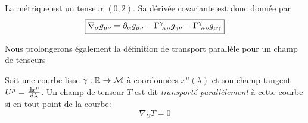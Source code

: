 \begin{exmp}
    La métrique est un tenseur $(0,2)$. Sa dérivée covariante est donc donnée par
    \begin{equation}
        \boxed{\nabla_{\alpha} g_{\mu \nu} = \partial_{\alpha}g_{\mu \nu} - \Gamma\indices{^{\gamma}_{\!\alpha \mu}}g_{\gamma \nu}-\Gamma\indices{^{\gamma}_{\!\alpha \nu}}g_{\mu \gamma}}
    \end{equation}
\end{exmp}
Nous prolongerons également la définition de transport parallèle pour un champ de tenseurs
\begin{theoremframe}
    \begin{defi}
    
        Soit une courbe lisse $\gamma:\mathbb{R} \to \mathcal{M}$ à coordonnées $x^{\mu}(\lambda)$ et son champ tangent $U^{\mu} = \frac{\mathrm{d} x^{\mu}}{\mathrm{d}\lambda}$. Un champ de tenseur $T$ est dit \emph{transporté parallèlement} à cette courbe si en tout point de la courbe:
        \begin{equation}
            \nabla_U T = 0
        \end{equation}
    \end{defi}
\end{theoremframe}
